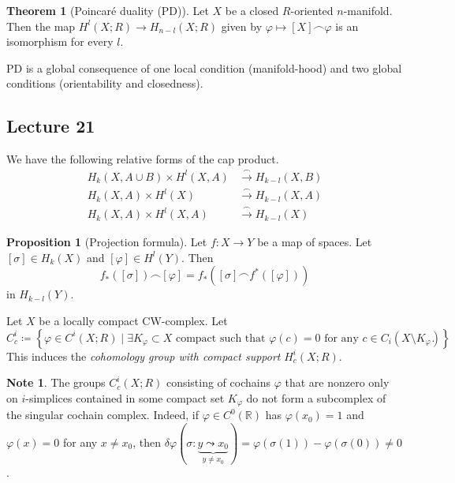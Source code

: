 \documentclass[10pt,letterpaper,cm]{nupset}
\theoremstyle{definition}
\newtheorem{note}[definition]{Note}
\theoremstyle{theorem}
\newtheorem{theorem}[definition]{Theorem}
\newtheorem{prop}[definition]{Proposition}
\theoremstyle{remark}
\newcommand{\R}{\mathbb{R}}
\newcommand{\1}{\mathbb{1}}
\newcommand{\0}{\vec 0}
\begin{document}
\begin{theorem}[Poincar\'e duality (PD)]
Let $X$ be a closed $R$-oriented $n$-manifold. Then the map $H^l(X; R) \to H_{n-l}(X;R)$ given by $\varphi \mapsto [X] \frown \varphi$ is an isomorphism for every $l$. 
\end{theorem}


PD is a global consequence of one local condition (manifold-hood) and two global conditions (orientability and closedness). 


\subsection{Lecture 21}


We have the following relative forms of the cap product.
\begin{align*}
H_k(X, A \cup B) \times H^l(X, A) & \overset{\frown}{\longrightarrow} H_{k-l}(X, B)
 \\ H_k(X, A) \times H^l(X) & \overset{\frown}{\longrightarrow} H_{k-l}(X, A)
 \\  H_k(X, A) \times H^l(X, A) & \overset{\frown}{\longrightarrow} H_{k-l}(X)
\end{align*}


\begin{prop}[Projection formula]
Let $f: X \to Y$ be a map of spaces. Let $\left[\sigma\right] \in H_k(X)$ and $\left[\varphi\right] \in H^l(Y)$. Then $$f_{\ast}([\sigma]) \frown [\varphi] = f_{\ast}([\sigma] \frown f^{\ast}([\varphi]))    $$ in $H_{k-l}(Y)$.
\end{prop}

\smallskip

Let $X$ be a locally compact CW-complex. Let $$C_c^i \coloneqq \left\{\varphi \in C^i(X; R) \mid \exists K_{\varphi}\subset X \text{ compact such that }\varphi(c) = 0 \text{ for any }c\in C_i(X \setminus K_{\varphi})\right\}.$$ This induces the \textit{cohomology group with compact support} $H^i_c(X; R)$.


\begin{note}
The groups $C^i_c(X;R)$ consisting of cochains $\varphi$ that are nonzero only on  $i$-simplices contained in some compact set $K_{\varphi}$ do not form a subcomplex of the singular cochain complex. Indeed, if $\varphi \in C^0(\R)$ has $\varphi(x_0) =1$ and $\varphi(x) =0$ for any $x\ne x_0$, then $\delta{\varphi}(\sigma : \underbrace{y \leadsto x_0}_{y\ne x_0}) = \varphi(\sigma(1)) - \varphi(\sigma(0)) \ne 0$.
\end{note}
\end{document}

